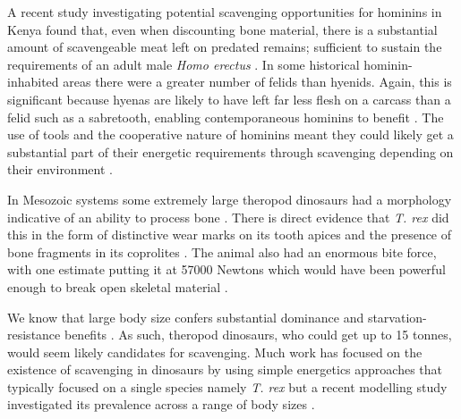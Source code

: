 \documentclass[a4paper,12pt]{article}
\begin{document}
A recent study investigating potential scavenging opportunities for hominins in Kenya found that, even when discounting bone material, there is a substantial amount of scavengeable meat left on predated remains; sufficient to sustain the requirements of an adult male \textit{Homo erectus} \citep{pobiner2015new}.
In some historical hominin-inhabited areas there were a greater number of felids than hyenids.
Again, this is significant because hyenas are likely to have left far less flesh on a carcass than a felid such as a sabretooth, enabling contemporaneous hominins to benefit \citep{pobiner2015new}.
The use of tools and the cooperative nature of hominins meant they could likely get a substantial part of their energetic requirements through scavenging depending on their environment \citep{moleon2014humans}.


In Mesozoic systems some extremely large theropod dinosaurs had a morphology indicative of an ability to process bone \citep[e.g. the robust skull and dentition of \textit{Tyrannosaurus rex}][]{hone2010feeding}.
There is direct evidence that \textit{T. rex} did this in the form of distinctive wear marks on its tooth apices \citep{farlow1994wear,schubert2005wear} and the presence of bone fragments in its coprolites \citep{chin1998king}.
The animal also had an enormous bite force, with one estimate putting it at 57000 Newtons \citep{bates2012estimating} which would have been powerful enough to break open skeletal material \citep{rayfield2001cranial}.


We know that large body size confers substantial dominance and starvation-resistance benefits \citep{ruxton2004obligate}. 
As such, theropod dinosaurs, who could get up to 15 tonnes, would seem likely candidates for scavenging. 
Much work has focused on the existence of scavenging in dinosaurs by using simple energetics approaches that typically focused on a single species namely \textit{T. rex} \citep{ruxton2003could,carbone2011intra} but a recent modelling study investigated its prevalence across a range of body sizes \citep{kane2016body}.
\end{document}
